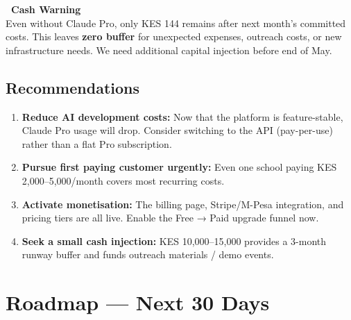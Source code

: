 \documentclass[12pt,a4paper]{article}
\begin{document}
\begin{mdframed}[linecolor=rose, linewidth=1.5pt, innerleftmargin=12pt,
  innertopmargin=8pt, innerbottommargin=8pt, backgroundcolor=rose!5]
\textbf{\color{rose}\faExclamationTriangle\ Cash Warning}\\[4pt]
Even without Claude Pro, only KES 144 remains after next month's committed costs.
This leaves \textbf{zero buffer} for unexpected expenses, outreach costs, or new
infrastructure needs. We need additional capital injection before end of May.
\end{mdframed}

\subsection{Recommendations}

\begin{enumerate}[leftmargin=1.6em, itemsep=4pt]
  \item \textbf{Reduce AI development costs:} Now that the platform is feature-stable,
        Claude Pro usage will drop. Consider switching to the API (pay-per-use)
        rather than a flat Pro subscription.
  \item \textbf{Pursue first paying customer urgently:} Even one school paying
        KES 2,000–5,000/month covers most recurring costs.
  \item \textbf{Activate monetisation:} The billing page, Stripe/M-Pesa integration,
        and pricing tiers are all live. Enable the Free → Paid upgrade funnel now.
  \item \textbf{Seek a small cash injection:} KES 10,000–15,000 provides a 3-month
        runway buffer and funds outreach materials / demo events.
\end{enumerate}

\section{Roadmap — Next 30 Days}
\end{document}
